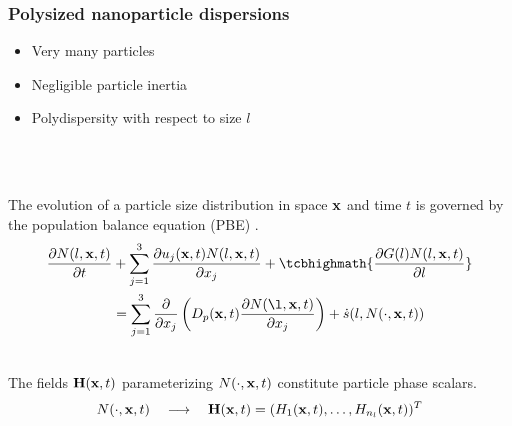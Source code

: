 \documentclass[10pt,xcolor=dvipsnames]{beamer}
\newcommand*{\itemskip}{0.25\baselineskip}
\renewcommand{\cite}{\parencite}
\begin{document}
\begin{frame}[t]

  \frametitle{Polysized nanoparticle dispersions}

  \vspace{-0.5\baselineskip}
  \begin{minipage}[t]{0.6\columnwidth}\vskip0pt
  \justifying{}
  \begin{itemize}
  \item Very many particles
  \vspace{\itemskip}
  \item Negligible particle inertia
  \vspace{\itemskip}
  \item Polydispersity with respect to size $l$
  \end{itemize}
  \end{minipage}\hfill
  \begin{minipage}[t]{0.38\columnwidth}\vskip0pt
  \resizebox{\columnwidth}{!}{}
  \end{minipage}\\
  \vspace{0.5\baselineskip}

  \\
  \justifying The evolution of a particle size distribution in space ${\mathbf x}$ and time $t$ is governed by the population balance equation (PBE) \cite{Hulburt1964}.
  \begin{equation*}
  \begin{split}
    \frac{\partial N(l, \xbf, t)}{\partial t} &+ \sum_{j = 1}^{3} \frac{\partial u_j(\xbf, t) N(l, \xbf, t)}{\partial x_j}
    + \tcbhighmath{\frac{\partial G(l) N(l, \xbf, t)}{\partial l}} \\
    &= \sum_{j = 1}^{3} \frac{\partial}{\partial x_j}\left(D_p(\xbf, t) \frac{\partial N(\l, \xbf, t)}{\partial x_j}\right) + \dot{s}(l, N(\cdot, \xbf, t))
  \label{eq:pbe}
  \end{split}
  \end{equation*}

  \\
  \justifying The fields ${\mathbf H}({\mathbf x}, t)$ parameterizing $N(\cdot, {\mathbf x}, t)$ constitute particle phase scalars.
  \begin{equation*}
    N(\cdot, {\mathbf x}, t) \quad\longrightarrow\quad {\mathbf H}({\mathbf x}, t) = (H_1({\mathbf x}, t), \ldots, H_{n_l}({\mathbf x}, t))^T
  \end{equation*}

\end{frame}
\end{document}
